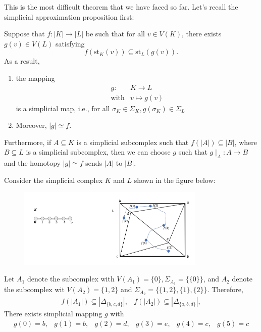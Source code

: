 This is the most difficult theorem that we have faced so far. Let's recall the simplicial approximation proposition first:
\clearpage
\begin{remark}
\begin{proposition}
Suppose that $f:|K|\to|L|$ be such that for all $v\in V(K)$, there exists $g(v)\in V(L)$ satisfying 
\[
f(\text{st}_K(v))\subseteq\text{st}_L(g(v)).
\]
As a result,
\begin{enumerate}
\item
the mapping
\[
\begin{array}{ll}
g:&K\to L\\
\text{with}&v\mapsto g(v)
\end{array}
\]
is a simplicial map, i.e., for all $\sigma_K\in\Sigma_K, g(\sigma_K)\in\Sigma_L$
\item
Moreover, $|g|\simeq f.$
\end{enumerate}
Furthermore, if $A\subseteq K$ is a simplicial subcomplex such that $f(|A|)\subseteq |B|$, where $B\subseteq L$ is a simplicial subcomplex, then we can choose $g$ such that $g\mid_A:A\to B$ and the homotopy $|g|\simeq f$ sends $|A|$ to $|B|$.
\end{proposition}
\end{remark}
\begin{example}
Consider the simplicial complex $K$ and $L$ shown in the figure below:
\begin{figure}[H]
\centering
\includegraphics[width=0.8\textwidth]{week12/f_19}
\end{figure}
Let $A_1$ denote the subcomplex with $V(A_1)=\{0\},\Sigma_{A_1}=\{\{0\}\}$, and $A_2$ denote the subcomplex wit $V(A_2) = \{1,2\}$ and $\Sigma_{A_2}=\{\{1,2\},\{1\},\{2\}\}$.
Therefore, 
\[
\begin{array}{ll}
f(|A_1|)\subseteq|\Delta_{\{b,c,d\}}|,
&
f(|A_2|)\subseteq|\Delta_{\{a,b,d\}}|,
\end{array}
\]
There exists simplicial mapping $g$ with
\[
\begin{array}{llllll}
g(0)=b,
&
g(1)=b,
&
g(2)=d,
&
g(3)=e,
&
g(4)=c,
&
g(5)=c
\end{array}
\]
\end{example}

